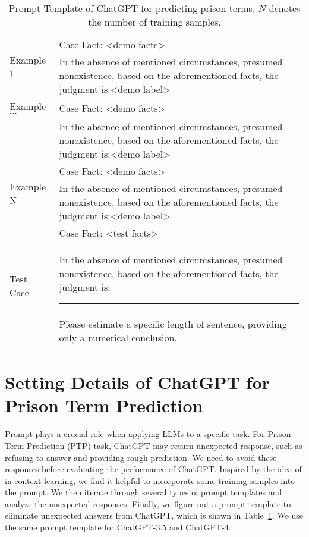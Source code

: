 \begin{table}
    \centering
    \scriptsize
    \caption{Prompt Template of ChatGPT for predicting prison terms. $N$ denotes the number of training samples.}
    \begin{tabular}{p{}|p{}}
    \toprule
       \multirow{2}{*}{Example 1}  & Case Fact: <demo facts>\\
       & In the absence of mentioned circumstances, presumed nonexistence, based on the aforementioned facts, the judgment is:<demo label>\\
       \multirow{1}{*}{Example $\cdots$}  & Case Fact: <demo facts>\\
       & In the absence of mentioned circumstances, presumed nonexistence, based on the aforementioned facts, the judgment is:<demo label>\\
       \multirow{2}{*}{Example N}  & Case Fact: <demo facts>\\
       & In the absence of mentioned circumstances, presumed nonexistence, based on the aforementioned facts, the judgment is:<demo label>\\
       \multirow{3}{*}{Test Case}  & Case Fact: <test facts>\\
       & In the absence of mentioned circumstances, presumed nonexistence, based on the aforementioned facts, the judgment is:\rule{1cm}{0.4pt}\\
       & Please estimate a specific length of sentence, providing only a numerical conclusion.\\
       \bottomrule
    \end{tabular}
    \label{tab:gpt_input}
\end{table}

\section{Setting Details of ChatGPT for Prison Term Prediction}
\label{sec:b}

Prompt plays a crucial role when applying LLMs to a specific task. For Prison Term Prediction (PTP) task, ChatGPT may return unexpected response, such as refusing to answer and providing rough prediction. We need to avoid these responses before evaluating the performance of ChatGPT. Inspired by the idea of in-context learning, we find it helpful to incorporate some training samples into the prompt. We then iterate through several types of prompt templates and analyze the unexpected responses. Finally, we figure out a prompt template to eliminate unexpected answers from ChatGPT, which is shown in Table~\ref{tab:gpt_input}. We use the same prompt template for ChatGPT-3.5 and ChatGPT-4.

